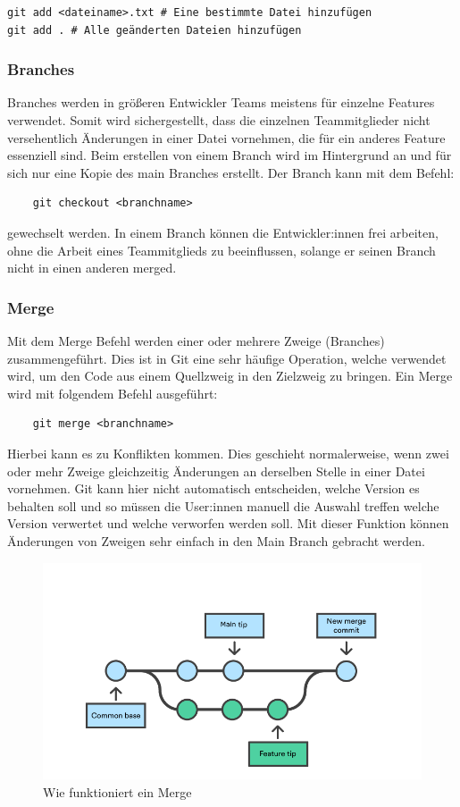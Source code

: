 \begin{verbatim}
git add <dateiname>.txt # Eine bestimmte Datei hinzufügen
git add . # Alle geänderten Dateien hinzufügen
\end{verbatim}

\subsubsection{Branches}

Branches werden in größeren Entwickler Teams meistens für einzelne Features verwendet. Somit wird sichergestellt, dass die einzelnen Teammitglieder nicht versehentlich Änderungen in einer Datei vornehmen, die für ein anderes Feature essenziell sind. Beim erstellen von einem Branch wird im Hintergrund an und für sich nur eine Kopie des main Branches erstellt. Der Branch kann mit dem Befehl: 

\begin{verbatim}
    git checkout <branchname>
\end{verbatim}

gewechselt werden.
In einem Branch können die Entwickler:innen frei arbeiten, ohne die Arbeit eines Teammitglieds zu beeinflussen, solange er seinen Branch nicht in einen anderen merged.

\cite{Github_Branches}

\subsubsection{Merge}

Mit dem Merge Befehl werden einer oder mehrere Zweige (Branches) zusammengeführt. Dies ist in Git eine sehr häufige Operation, welche verwendet wird, um den Code aus einem Quellzweig in den Zielzweig zu bringen.
Ein Merge wird mit folgendem Befehl ausgeführt: 

\begin{verbatim}
    git merge <branchname>
\end{verbatim}

Hierbei kann es zu Konflikten kommen. Dies geschieht normalerweise, wenn zwei oder mehr Zweige gleichzeitig Änderungen an derselben Stelle in einer Datei vornehmen. Git kann hier nicht automatisch entscheiden, welche Version es behalten soll und so müssen die User:innen manuell die Auswahl treffen welche Version verwertet und welche verworfen werden soll. Mit dieser Funktion können Änderungen von Zweigen sehr einfach in den Main Branch gebracht werden.

\begin{figure}[h!]
    \centering
    \includegraphics[width=0.6\linewidth]{pics/merge.png}
    \caption{Wie funktioniert ein Merge}
    \label{fig:enter-label}
\end{figure}


